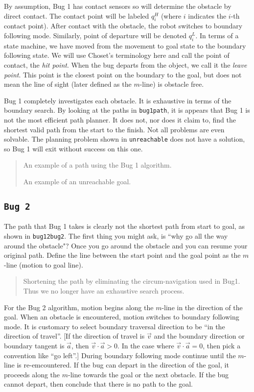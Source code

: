 By assumption, Bug 1 has contact sensors so will determine the obstacle
by direct contact. The contact point will be labeled \(q^H_i\) (where
\(i\) indicates the \(i\)-th contact point). After contact with the
obstacle, the robot switches to boundary following mode. Similarly,
point of departure will be denoted \(q^L_i\). In terms of a state
machine, we have moved from the movement to goal state to the boundary
following state. We will use Choset's terminology here and call the
point of contact, the \emph{hit point}. When the bug departs from the
object, we call it the \emph{leave point}. This point is the closest
point on the boundary to the goal, but does not mean the line of sight
(later defined as the \(m\)-line) is obstacle free.

Bug 1 completely investigates each obstacle. It is exhaustive in terms
of the boundary search. By looking at the paths in \texttt{bug1path}, it
is appears that Bug 1 is not the most efficient path planner. It does
not, nor does it claim to, find the shortest valid path from the start
to the finish. Not all problems are even solvable. The planning problem
shown in \texttt{unreachable} does not have a solution, so Bug 1 will
exit without success on this one.

\begin{quote}
An example of a path using the Bug 1 algorithm.

An example of an unreachable goal.
\end{quote}

\hypertarget{bug-2}{%
\subsection{\texorpdfstring{\texttt{Bug\ 2}}{Bug 2}}\label{bug-2}}

The path that Bug 1 takes is clearly not the shortest path from start to
goal, as shown in \texttt{bug12bug2}. The first thing you might ask, is
``why go all the way around the obstacle"? Once you go around the
obstacle and you can resume your original path. Define the line between
the start point and the goal point as the \(m\)-line (motion to goal
line).

\begin{quote}
Shortening the path by eliminating the circum-navigation used in Bug1.
Thus we no longer have an exhaustive search process.
\end{quote}

For the Bug 2 algorithm, motion begins along the \(m\)-line in the
direction of the goal. When an obstacle is encountered, motion switches
to boundary following mode. It is customary to select boundary traversal
direction to be ``in the direction of travel''. {[}If the direction of
travel is \(\vec{v}\) and the boundary direction or boundary tangent is
\(\vec{a}\), then \(\vec{v}\cdot\vec{a} > 0\). In the case where
\(\vec{v}\cdot\vec{a} = 0\), then pick a convention like ``go left''.{]}
During boundary following mode continue until the \(m\)-line is
re-emcountered. If the bug can depart in the direction of the goal, it
proceeds along the \(m\)-line towards the goal or the next obstacle. If
the bug cannot depart, then conclude that there is no path to the goal.

